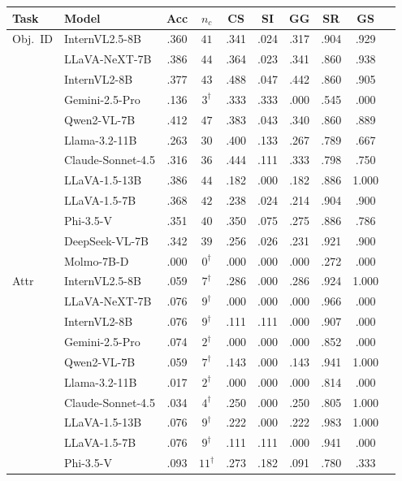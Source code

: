 \begin{tabular}{@{}llcccccccc@{}}
\toprule
Task & Model & Acc & $n_c$ & CS & SI & GG & SR & GS \\
\midrule
Obj.\ ID & InternVL2.5-8B & .360 & $41$ & .341 & .024 & .317 & .904 & .929 \\
 & LLaVA-NeXT-7B & .386 & $44$ & .364 & .023 & .341 & .860 & .938 \\
 & InternVL2-8B & .377 & $43$ & .488 & .047 & .442 & .860 & .905 \\
 & Gemini-2.5-Pro & .136 & $3^\dagger$ & .333 & .333 & .000 & .545 & .000 \\
 & Qwen2-VL-7B & .412 & $47$ & .383 & .043 & .340 & .860 & .889 \\
 & Llama-3.2-11B & .263 & $30$ & .400 & .133 & .267 & .789 & .667 \\
 & Claude-Sonnet-4.5 & .316 & $36$ & .444 & .111 & .333 & .798 & .750 \\
 & LLaVA-1.5-13B & .386 & $44$ & .182 & .000 & .182 & .886 & 1.000 \\
 & LLaVA-1.5-7B & .368 & $42$ & .238 & .024 & .214 & .904 & .900 \\
 & Phi-3.5-V & .351 & $40$ & .350 & .075 & .275 & .886 & .786 \\
 & DeepSeek-VL-7B & .342 & $39$ & .256 & .026 & .231 & .921 & .900 \\
 & Molmo-7B-D & .000 & $0^\dagger$ & .000 & .000 & .000 & .272 & .000 \\
\midrule
Attr & InternVL2.5-8B & .059 & $7^\dagger$ & .286 & .000 & .286 & .924 & 1.000 \\
 & LLaVA-NeXT-7B & .076 & $9^\dagger$ & .000 & .000 & .000 & .966 & .000 \\
 & InternVL2-8B & .076 & $9^\dagger$ & .111 & .111 & .000 & .907 & .000 \\
 & Gemini-2.5-Pro & .074 & $2^\dagger$ & .000 & .000 & .000 & .852 & .000 \\
 & Qwen2-VL-7B & .059 & $7^\dagger$ & .143 & .000 & .143 & .941 & 1.000 \\
 & Llama-3.2-11B & .017 & $2^\dagger$ & .000 & .000 & .000 & .814 & .000 \\
 & Claude-Sonnet-4.5 & .034 & $4^\dagger$ & .250 & .000 & .250 & .805 & 1.000 \\
 & LLaVA-1.5-13B & .076 & $9^\dagger$ & .222 & .000 & .222 & .983 & 1.000 \\
 & LLaVA-1.5-7B & .076 & $9^\dagger$ & .111 & .111 & .000 & .941 & .000 \\
 & Phi-3.5-V & .093 & $11^\dagger$ & .273 & .182 & .091 & .780 & .333 \\

\end{tabular}
